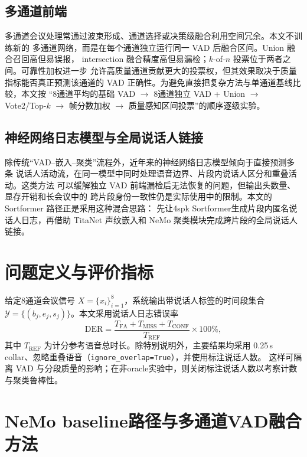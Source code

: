 \documentclass[UTF8,a4paper,10pt]{ctexart}
\begin{document}
\subsection{多通道前端}

多通道会议处理常通过波束形成、通道选择或决策级融合利用空间冗余。本文不训练新的
多通道网络，而是在每个通道独立运行同一 VAD 后融合区间。Union 融合召回高但易误报，
intersection 融合精度高但易漏检；$k$-of-$n$ 投票位于两者之间。可靠性加权进一步
允许高质量通道贡献更大的投票权，但其效果取决于质量指标能否真正预测该通道的 VAD
正确性。为避免直接把复杂方法与单通道基线比较，本文按
“8通道平均的基础 VAD $\rightarrow$ 8通道独立 VAD + Union
$\rightarrow$ Vote2/Top-$k$ $\rightarrow$ 帧分数加权
$\rightarrow$ 质量感知区间投票”的顺序逐级实验。

\subsection{神经网络日志模型与全局说话人链接}

除传统“VAD--嵌入--聚类”流程外，近年来的神经网络日志模型倾向于直接预测多条
说话人活动流，在同一模型中同时处理语音边界、片段内说话人区分和重叠活动。这类方法
可以缓解独立 VAD 前端漏检后无法恢复的问题，但输出头数量、显存开销和长会议中的
跨片段身份一致性仍是实际使用中的限制。本文的 Sortformer 路径正是采用这种混合思路：
先让4spk Sortformer生成片段内匿名说话人日志，再借助 TitaNet 声纹嵌入和 NeMo
聚类模块完成跨片段的全局说话人链接。

\section{问题定义与评价指标}

给定8通道会议信号 $X=\{x_i\}_{i=1}^{8}$，系统输出带说话人标签的时间段集合
$\mathcal{Y}=\{(b_j,e_j,s_j)\}$。本文采用说话人日志错误率
\begin{equation}
\mathrm{DER} =
\frac{T_{\mathrm{FA}}+T_{\mathrm{MISS}}+T_{\mathrm{CONF}}}
{T_{\mathrm{REF}}}\times 100\% ,
\label{eq:der}
\end{equation}
其中 $T_{\mathrm{REF}}$ 为计分参考语音总时长。除特别说明外，主要结果均采用
0.25\,s collar、忽略重叠语音（\texttt{ignore\_overlap=True}），并使用标注说话人数。
这样可隔离 VAD 与分段质量的影响；在非oracle实验中，则关闭标注说话人数以考察计数与聚类鲁棒性。

\section{NeMo baseline路径与多通道VAD融合方法}
\end{document}
